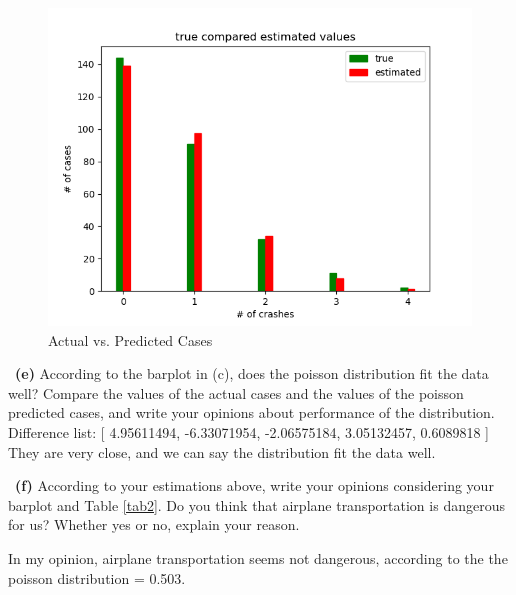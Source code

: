\documentclass[a4 paper]{article}
\numberwithin{equation}{section}
\newcommand{\subproblem}[1]{~\newline\textbf{(#1)}}
\newcommand{\0}{\mathbf{0}}
\begin{document}
\begin{figure}[h!]
    \centering
    \includegraphics[scale=0.6]{plot.png}
    \caption{Actual vs. Predicted Cases}
    \label{fig:barplot}
\end{figure}

\subproblem{e} According to the barplot in (c), does the poisson distribution fit the data well? Compare the values of the actual cases and the values of the poisson predicted cases, and write your opinions about performance of the distribution.\\

Difference list: [ 4.95611494, -6.33071954, -2.06575184,  3.05132457,  0.6089818 ]
They are very close, and we can say the distribution fit the data well.

\subproblem{f} According to your estimations above, write your opinions considering your barplot and Table \ref{tab2}. Do you think that airplane transportation is dangerous for us? Whether yes or no, explain your reason.

In my opinion, airplane transportation seems not dangerous, according to the the poisson distribution = 0.503.
\end{document}
